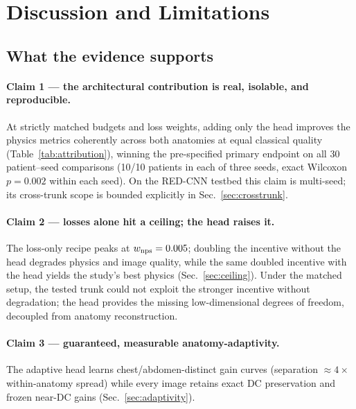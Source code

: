 \section{Discussion and Limitations}
\label{sec:discussion}

\subsection{What the evidence supports}
\label{sec:claims}

\paragraph{Claim 1 --- the architectural contribution is real, isolable, and reproducible.}
At strictly matched budgets and loss weights, adding only the head improves the physics metrics coherently across both anatomies at equal classical quality (Table~\ref{tab:attribution}), winning the pre-specified primary endpoint on all 30 patient--seed comparisons (10/10 patients in each of three seeds, exact Wilcoxon $p = 0.002$ within each seed). On the RED-CNN testbed this claim is multi-seed; its cross-trunk scope is bounded explicitly in Sec.~\ref{sec:crosstrunk}.

\paragraph{Claim 2 --- losses alone hit a ceiling; the head raises it.}
The loss-only recipe peaks at $w_{\mathrm{nps}} = 0.005$; doubling the incentive without the head degrades physics and image quality, while the same doubled incentive with the head yields the study's best physics (Sec.~\ref{sec:ceiling}). Under the matched setup, the tested trunk could not exploit the stronger incentive without degradation; the head provides the missing low-dimensional degrees of freedom, decoupled from anatomy reconstruction.

\paragraph{Claim 3 --- guaranteed, measurable anatomy-adaptivity.}
The adaptive head learns chest/abdomen-distinct gain curves (separation ${\approx}4\times$ within-anatomy spread) while every image retains exact DC preservation and frozen near-DC gains (Sec.~\ref{sec:adaptivity}).

